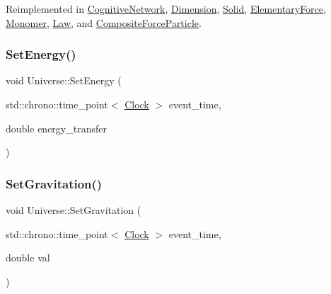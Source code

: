 Reimplemented in \mbox{\hyperlink{classCognitiveNetwork_a270f6842ec14b3e5b80dedf7b48ea6f4}{Cognitive\+Network}}, \mbox{\hyperlink{classDimension_aead73fc6a25388d14b514b2170735b1b}{Dimension}}, \mbox{\hyperlink{classSolid_a6617ae9fe4707d760a23b54eddf00dec}{Solid}}, \mbox{\hyperlink{classElementaryForce_af4f12038c33d7edf9f13339fcd632ec9}{Elementary\+Force}}, \mbox{\hyperlink{classMonomer_aa034728b74053ed3df452ddc8f1b46e8}{Monomer}}, \mbox{\hyperlink{classLaw_aca9bb82839ddb46bd89f52b6211c5a54}{Law}}, and \mbox{\hyperlink{classCompositeForceParticle_ad53c5d396b3c56241174a9bd78f9e07a}{Composite\+Force\+Particle}}.

\mbox{\label{classUniverse_a868250e67d0fcb2483aa8bdd73c40a02}} 
\subsubsection{\texorpdfstring{Set\+Energy()}{SetEnergy()}}
{\footnotesize\ttfamily void Universe\+::\+Set\+Energy (\begin{DoxyParamCaption}\item[{std\+::chrono\+::time\+\_\+point$<$ \mbox{\hyperlink{universe_8h_a0ef8d951d1ca5ab3cfaf7ab4c7a6fd80}{Clock}} $>$}]{event\+\_\+time,  }\item[{double}]{energy\+\_\+transfer }\end{DoxyParamCaption})}

\mbox{\label{classUniverse_ae0cb8d86b2fbb8396d605160344b42f5}} 
\subsubsection{\texorpdfstring{Set\+Gravitation()}{SetGravitation()}}
{\footnotesize\ttfamily void Universe\+::\+Set\+Gravitation (\begin{DoxyParamCaption}\item[{std\+::chrono\+::time\+\_\+point$<$ \mbox{\hyperlink{universe_8h_a0ef8d951d1ca5ab3cfaf7ab4c7a6fd80}{Clock}} $>$}]{event\+\_\+time,  }\item[{double}]{val }\end{DoxyParamCaption})\hspace{0.3cm}{\ttfamily [virtual]}}



